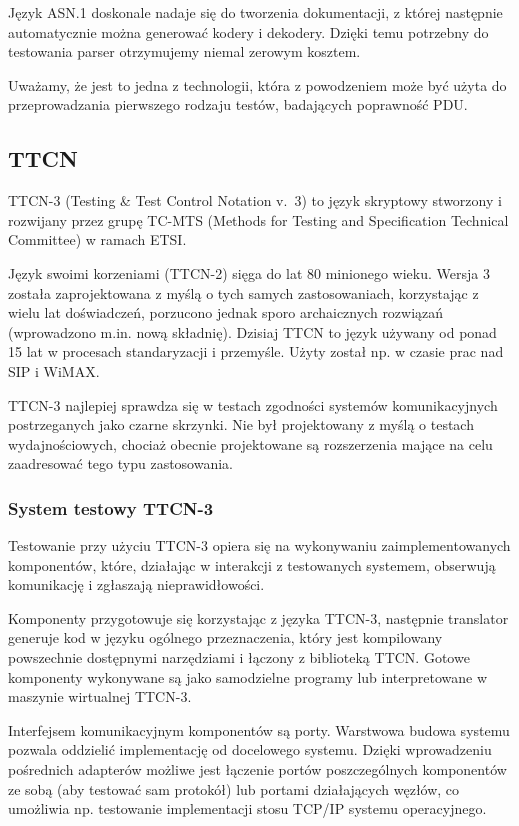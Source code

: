 \documentclass[00-praca-magisterska.tex]{subfiles}
\begin{document}
Język ASN.1 doskonale nadaje się do tworzenia dokumentacji, z której następnie
automatycznie można generować kodery i dekodery. Dzięki temu potrzebny do
testowania parser otrzymujemy niemal zerowym kosztem.

Uważamy, że jest to jedna z technologii, która z powodzeniem może być użyta do
przeprowadzania pierwszego rodzaju testów, badających poprawność PDU.

\subsection{TTCN}

TTCN-3 (Testing \& Test Control Notation v.~3) to język skryptowy stworzony i
rozwijany przez grupę TC-MTS (Methods for Testing and Specification Technical
Committee) w ramach ETSI.

Język swoimi korzeniami (TTCN-2) sięga do lat 80 minionego wieku. Wersja 3
została zaprojektowana z myślą o tych samych zastosowaniach, korzystając z wielu
lat doświadczeń, porzucono jednak sporo archaicznych rozwiązań (wprowadzono
m.in. nową składnię). Dzisiaj TTCN to język używany od ponad 15 lat w procesach
standaryzacji i przemyśle. Użyty został np. w czasie prac nad SIP i WiMAX.

TTCN-3 najlepiej sprawdza się w testach zgodności systemów komunikacyjnych
postrzeganych jako czarne skrzynki. Nie był projektowany z myślą o testach
wydajnościowych, chociaż obecnie projektowane są rozszerzenia mające na celu
zaadresować tego typu zastosowania.

\subsubsection{System testowy TTCN-3}

Testowanie przy użyciu TTCN-3 opiera się na wykonywaniu zaimplementowanych
komponentów, które, działając w interakcji z testowanych systemem, obserwują
komunikację i zgłaszają nieprawidłowości.

Komponenty przygotowuje się korzystając z języka TTCN-3, następnie translator
generuje kod w języku ogólnego przeznaczenia, który jest kompilowany powszechnie
dostępnymi narzędziami i łączony z biblioteką TTCN. Gotowe komponenty wykonywane
są jako samodzielne programy lub interpretowane w maszynie wirtualnej TTCN-3.

Interfejsem komunikacyjnym komponentów są porty. Warstwowa budowa systemu
pozwala oddzielić implementację od docelowego systemu. Dzięki wprowadzeniu
pośrednich adapterów możliwe jest łączenie portów poszczególnych komponentów ze
sobą (aby testować sam protokół) lub portami działających węzłów, co umożliwia
np. testowanie implementacji stosu TCP/IP systemu operacyjnego.
\end{document}
